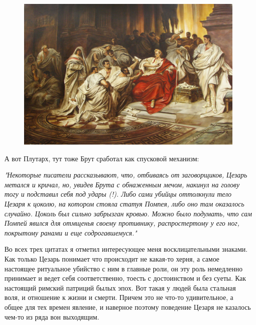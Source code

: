 \begin{figure}[h!tb] 
	\centering\includegraphics[scale=0.3]{ReligionRomeCaesar/1595745705118471335.png}
\end{figure}



А вот Плутарх, тут тоже Брут сработал как спусковой механизм:

\textit{"Некоторые писатели рассказывают, что, отбиваясь от заговорщиков, Цезарь метался и кричал, но, увидев Брута с обнаженным мечом, накинул на голову тогу и подставил себя под удары (!). Либо сами убийцы оттолкнули тело Цезаря к цоколю, на котором стояла статуя Помпея, либо оно там оказалось случайно. Цоколь был сильно забрызган кровью. Можно было подумать, что сам Помпей явился для отмщенья своему противнику, распростертому у его ног, покрытому ранами и еще содрогавшемуся."} 

Во всех трех цитатах я отметил интересующее меня восклицательными знаками. Как только Цезарь понимает что происходит не какая-то херня, а самое настоящее ритуальное убийство с ним в главные роли, он эту роль немедленно принимает и ведет себя соответственно, тоесть с достоинством и без суеты. Как настоящий римский патриций былых эпох. Вот такая у людей была стальная воля, и отношение к жизни и смерти. Причем это не что-то удивительное, а общее для тех времен явление, и наверное поэтому поведение Цезаря не казалось чем-то из ряда вон выходящим.


